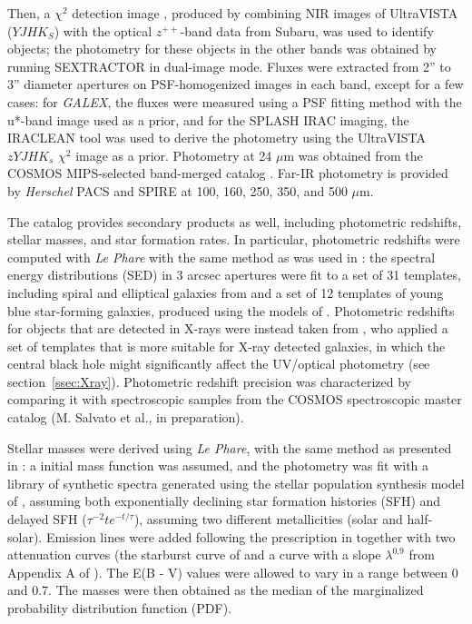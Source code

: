 Then, a $\chi^2$ detection image \citep{1999AJ....117...68S}, produced by combining NIR images of UltraVISTA ($YJHK_S$) with the optical $z^{++}$-band data from Subaru, was used to identify objects; the photometry for these objects in the other bands was obtained by running SEXTRACTOR in dual-image mode. Fluxes were extracted from 2'' to 3'' diameter apertures on PSF-homogenized images in each band, except for a few cases: for \textit{GALEX}, the fluxes were measured using a PSF fitting method with the u*-band image used as a prior, and for the SPLASH IRAC imaging, the IRACLEAN tool \citep{2012ApJS..203...23H} was used to derive the photometry using the UltraVISTA $zYJHK_s$ $\chi^2$ image as a prior.
Photometry at 24 $\mu$m was obtained from the COSMOS MIPS-selected band-merged catalog \citep{2009ApJ...703..222L}. Far-IR photometry is provided by \textit{Herschel} PACS \citep[PEP guaranteed-time program,][]{2011A&A...532A..90L} and SPIRE \citep[HERMES consortium,][]{2012MNRAS.424.1614O} at 100, 160, 250, 350, and 500 $\mu$m.

The \citet{2016ApJS..224...24L} catalog provides secondary products as well, including photometric redshifts, stellar masses, and star formation rates. In particular, photometric redshifts were computed with \emph{Le Phare} \citep{2002MNRAS.329..355A, 2006A&A...457..841I} with the same method as was used in \citet{2013A&A...556A..55I}: the spectral energy distributions (SED) in 3 arcsec  apertures were fit to a set of 31 templates, including spiral and elliptical galaxies from \citet{2007ApJ...663...81P} and a set of 12 templates of young blue star-forming galaxies, produced using the models of \citet{2003MNRAS.344.1000B}. Photometric redshifts for objects that are detected in X-rays were instead taken from \citet{2016ApJ...817...34M}, who applied a set of templates that is more suitable for X-ray detected galaxies, in which the central black hole might significantly affect the UV/optical photometry (see section~\ref{ssec:Xray}). Photometric redshift precision was characterized by comparing it with spectroscopic samples from the COSMOS spectroscopic master catalog (M. Salvato et al., in preparation).%

Stellar masses were derived using \emph{Le Phare}, with the same method as presented in \citet{2015A&A...579A...2I}: a \citet{2003PASP..115..763C} initial mass function was assumed, and the photometry was fit with a library of synthetic spectra generated using the stellar population synthesis model of \citet{2003MNRAS.344.1000B}, assuming both exponentially declining star formation histories (SFH) and delayed SFH ($\tau^{-2}te^{-t/\tau}$), assuming two different metallicities (solar and half-solar). Emission lines were added following the prescription in \citet{2009ApJ...690.1236I} together with two attenuation curves (the starburst curve of \citealt{2000ApJ...533..682C} and a curve with a slope $\lambda^{0.9}$ from Appendix A of \citealt{2013A&A...558A..67A}). The E(B - V) values were allowed to vary in a range between 0 and 0.7. The masses were then obtained as the median of the marginalized probability distribution function (PDF).

